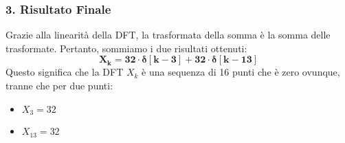 \begin{soluzione}{12}
    \subsubsection*{3. Risultato Finale}
    Grazie alla linearità della DFT, la trasformata della somma è la somma delle trasformate. Pertanto, sommiamo i due risultati ottenuti:
    \[
        \mathbf{X_k = 32 \cdot \delta[k - 3] + 32 \cdot \delta[k - 13]}
    \]
    Questo significa che la DFT $X_k$ è una sequenza di 16 punti che è zero ovunque, tranne che per due punti:
    \begin{itemize}
        \item $X_3 = 32$
        \item $X_{13} = 32$
    \end{itemize}
    
\end{soluzione}
